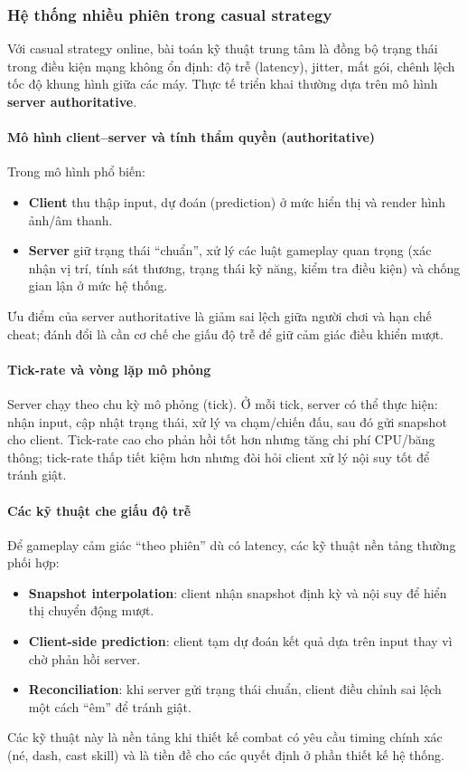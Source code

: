 \subsubsection{Hệ thống nhiều phiên trong casual strategy}

Với casual strategy online, bài toán kỹ thuật trung tâm là đồng bộ trạng thái trong điều kiện mạng không ổn định: độ trễ (latency), jitter, mất gói, chênh lệch tốc độ khung hình giữa các máy. Thực tế triển khai thường dựa trên mô hình \textbf{server authoritative}\cite{moriarty-networked,gaffer-networking}.

\paragraph{Mô hình client--server và tính thẩm quyền (authoritative)}
Trong mô hình phổ biến:
\begin{itemize}
    \item \textbf{Client} thu thập input, dự đoán (prediction) ở mức hiển thị và render hình ảnh/\allowbreak âm thanh.
    \item \textbf{Server} giữ trạng thái ``chuẩn'', xử lý các luật gameplay quan trọng (xác nhận vị trí, tính sát thương, trạng thái kỹ năng, kiểm tra điều kiện) và chống gian lận ở mức hệ thống\cite{moriarty-networked}.
\end{itemize}
Ưu điểm của server authoritative là giảm sai lệch giữa người chơi và hạn chế cheat; đánh đổi là cần cơ chế che giấu độ trễ để giữ cảm giác điều khiển mượt.

\paragraph{Tick-rate và vòng lặp mô phỏng}
Server chạy theo chu kỳ mô phỏng (tick). Ở mỗi tick, server có thể thực hiện: nhận input, cập nhật trạng thái, xử lý va chạm/\allowbreak chiến đấu, sau đó gửi snapshot cho client\cite{moriarty-networked}. Tick-rate cao cho phản hồi tốt hơn nhưng tăng chi phí CPU/\allowbreak băng thông; tick-rate thấp tiết kiệm hơn nhưng đòi hỏi client xử lý nội suy tốt để tránh giật.

\paragraph{Các kỹ thuật che giấu độ trễ}
Để gameplay cảm giác ``theo phiên'' dù có latency, các kỹ thuật nền tảng thường phối hợp\cite{moriarty-networked,gaffer-networking}:
\begin{itemize}
    \item \textbf{Snapshot interpolation}: client nhận snapshot định kỳ và nội suy để hiển thị chuyển động mượt.
    \item \textbf{Client-side prediction}: client tạm dự đoán kết quả dựa trên input thay vì chờ phản hồi server.
    \item \textbf{Reconciliation}: khi server gửi trạng thái chuẩn, client điều chỉnh sai lệch một cách ``êm'' để tránh giật.
\end{itemize}
Các kỹ thuật này là nền tảng khi thiết kế combat có yêu cầu timing chính xác (né, dash, cast skill) và là tiền đề cho các quyết định ở phần thiết kế hệ thống.

